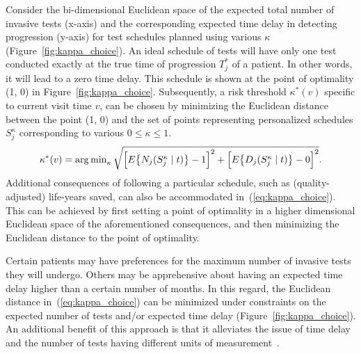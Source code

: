 Consider the bi-dimensional Euclidean space of the expected total number of invasive tests (x-axis) and the corresponding expected time delay in detecting progression (y-axis) for test schedules planned using various $\kappa$ (Figure~\ref{fig:kappa_choice}). An ideal schedule of tests will have only one test conducted exactly at the true time of progression $T^*_j$ of a patient. In other words, it will lead to a zero time delay. This schedule is shown at the point of optimality (1, 0) in Figure~\ref{fig:kappa_choice}. Subsequently, a risk threshold $\kappa^*(v)$ specific to current visit time $v$, can be chosen by minimizing the Euclidean distance between the point (1, 0) and the set of points representing personalized schedules $S_j^{\kappa}$ corresponding to various $0 \leq \kappa \leq 1$.
\begin{equation}
\label{eq:kappa_choice}
\kappa^*(v) = \argmin_{\kappa} \sqrt{\Big[E\big\{N_j(S_j^{\kappa} \mid t)\big\} - 1\Big]^2 + \Big[E\big\{D_j(S_j^{\kappa} \mid t)\big\} - 0\Big]^2}.
\end{equation}
Additional consequences of following a particular schedule, such as (quality-adjusted) life-years saved, can also be accommodated in~(\ref{eq:kappa_choice}). This can be achieved by first setting a point of optimality in a higher dimensional Euclidean space of the aforementioned consequences, and then minimizing the Euclidean distance to the point of optimality.

Certain patients may have preferences for the maximum number of invasive tests they will undergo. Others may be apprehensive about having an expected time delay higher than a certain number of months. In this regard, the Euclidean distance in~(\ref{eq:kappa_choice}) can be minimized under constraints on the expected number of tests and/or expected time delay (Figure~\ref{fig:kappa_choice}). An additional benefit of this approach is that it alleviates the issue of time delay and the number of tests having different units of measurement~\citep{cook1994equivalence}.

